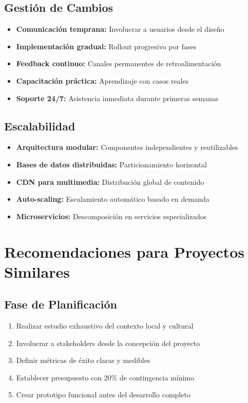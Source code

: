 \documentclass[12pt,a4paper]{report}
\begin{document}
\subsection{Gestión de Cambios}

\begin{itemize}
	\item \textbf{Comunicación temprana:} Involucrar a usuarios desde el diseño
	\item \textbf{Implementación gradual:} Rollout progresivo por fases
	\item \textbf{Feedback continuo:} Canales permanentes de retroalimentación
	\item \textbf{Capacitación práctica:} Aprendizaje con casos reales
	\item \textbf{Soporte 24/7:} Asistencia inmediata durante primeras semanas
\end{itemize}

\subsection{Escalabilidad}

\begin{itemize}
	\item \textbf{Arquitectura modular:} Componentes independientes y reutilizables
	\item \textbf{Bases de datos distribuidas:} Particionamiento horizontal
	\item \textbf{CDN para multimedia:} Distribución global de contenido
	\item \textbf{Auto-scaling:} Escalamiento automático basado en demanda
	\item \textbf{Microservicios:} Descomposición en servicios especializados
\end{itemize}

\section{Recomendaciones para Proyectos Similares}

\subsection{Fase de Planificación}

\begin{enumerate}
	\item Realizar estudio exhaustivo del contexto local y cultural
	\item Involucrar a stakeholders desde la concepción del proyecto
	\item Definir métricas de éxito claras y medibles
	\item Establecer presupuesto con 20\% de contingencia mínimo
	\item Crear prototipo funcional antes del desarrollo completo
\end{enumerate}
\end{document}
